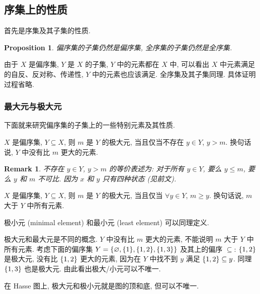 \documentclass[UTF8]{ctexart}
\theoremstyle{mystyle}
\newtheorem{proposition}{Proposition}[section]
\theoremstyle{myremark}
\newtheorem*{remark}{Remark}
\theoremstyle{plain}
\DeclarePairedDelimiter\set{\{}{\}}
\begin{document}
\subsection{序集上的性质}
首先是序集及其子集的性质.

\begin{proposition}
    偏序集的子集仍然是偏序集, 全序集的子集仍然是全序集.
\end{proposition}

由于 $ X $ 是偏序集, $ Y $ 是 $ X $ 的子集, $ Y $ 中的元素都在 $ X $ 中, 可以看出 $ X $ 中元素满足的自反、反对称、传递性, $ Y $ 中的元素也应该满足. 全序集及其子集同理. 具体证明过程省略.

\subsubsection{最大元与极大元}
下面就来研究偏序集的子集上的一些特别元素及其性质.

\begin{definition}
    $ X $ 是偏序集, $ Y \subseteq X $, 则 $ m $ 是 $ Y $ 的极大元, 当且仅当不存在 $ y \in Y $, $ y > m $. 换句话说, $ Y $ 中没有比 $ m $ 更大的元素. 
\end{definition}

\begin{remark}
    不存在 $ y \in Y $, $ y > m $ 的等价表述为: 对于所有 $ y \in Y $, 要么 $ y \leqslant m $, 要么 $ y $ 和 $ m $ 不可比. 因为 $ x $ 和 $ y $ 只有四种状态 (见前文).
\end{remark}

\begin{definition}
    $ X $ 是偏序集, $ Y \subseteq X $, 则 $ m $ 是 $ Y $ 的极大元, 当且仅当 $ \forall y \in Y $, $ m \ge y $. 换句话说, $ m $ 大于 $ Y $ 中所有元素.
\end{definition}

极小元 (minimal element) 和最小元 (least element) 可以同理定义.

极大元和最大元是不同的概念. $ Y $ 中没有比 $ m $ 更大的元素, 不能说明 $ m $ 大于 $ Y $ 中所有元素. 考虑下面的偏序集 $ Y = \set{\varnothing, \set{1}, \set{1, 2}, \set{1, 3}} $ 及其上的偏序 $ \subseteq $: $ \set{1, 2} $ 是极大元, 没有比 $ \set{1, 2} $ 更大的元素, 因为在 $ Y $ 中找不到 $ y $ 满足 $ \set{1, 2} \subseteq y $. 同理 $ \set{1, 3} $ 也是极大元. 由此看出极大/小元可以不唯一.

在 Hasse 图上, 极大元和极小元就是图的顶和底, 但可以不唯一. 
\end{document}
